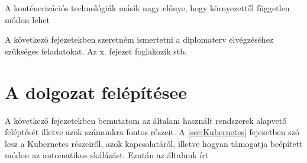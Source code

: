 A konténerizációs technológiák másik nagy előnye, hogy környezettől független módon lehet 


A következő fejezetekben szeretném ismertetni a diplomaterv elvégzéséhez szükséges feladatokat. Az x. fejezet foglakozik stb.

\section{A dolgozat felépítésee}
A következő fejezetekben bemutatom az általam használt rendszerek alapvető feléptését illetve  azok számunkra fontos részeit. A \ref{sec:Kubernetes} fejezetben szó lesz a Kubernetes részeiről, azok kapcsolatáról, illetve hogyan támogatja beépített módon az automatikus skálázást. Ezután az általunk írt
